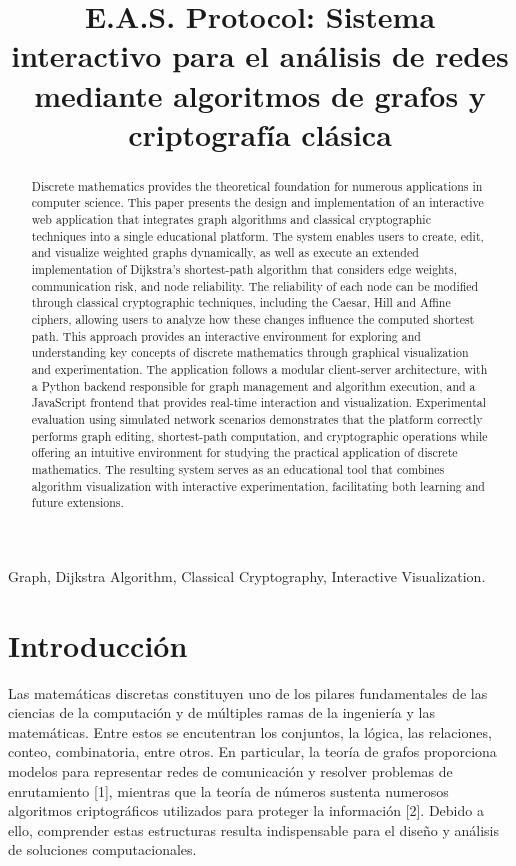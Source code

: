 \documentclass[conference]{IEEEtran}
\title{
E.A.S. Protocol: Sistema interactivo para el análisis de redes
mediante algoritmos de grafos y criptografía clásica
}
\author{
    \IEEEauthorblockN{
    Aimer Esteban Garcia Rojas,
    Jair Gomez Narvaez,
    Diego Alejandro Robayo Cordoba
    }

    \IEEEauthorblockA{
    Programa de Ingeniería de Sistemas\\
    Universidad Nacional de Colombia\\
    Julio 2026
    }
}
\begin{document}
\maketitle
\thispagestyle{empty}
\pagestyle{plain}
\setcounter{page}{1}

\begin{abstract}
    Discrete mathematics provides the theoretical foundation for numerous applications in computer science. This paper presents the design and implementation of an interactive web application that integrates graph algorithms and classical cryptographic techniques into a single educational platform. The system enables users to create, edit, and visualize weighted graphs dynamically, as well as execute an extended implementation of Dijkstra's shortest-path algorithm that considers edge weights, communication risk, and node reliability. The reliability of each node can be modified through classical cryptographic techniques, including the Caesar, Hill and Affine ciphers, allowing users to analyze how these changes influence the computed shortest path. This approach provides an interactive environment for exploring and understanding key concepts of discrete mathematics through graphical visualization and experimentation. The application follows a modular client-server architecture, with a Python backend responsible for graph management and algorithm execution, and a JavaScript frontend that provides real-time interaction and visualization. Experimental evaluation using simulated network scenarios demonstrates that the platform correctly performs graph editing, shortest-path computation, and cryptographic operations while offering an intuitive environment for studying the practical application of discrete mathematics. The resulting system serves as an educational tool that combines algorithm visualization with interactive experimentation, facilitating both learning and future extensions.
\end{abstract}


\begin{IEEEkeywords}
    Graph, Dijkstra Algorithm, Classical Cryptography, Interactive Visualization.
\end{IEEEkeywords}

\section{Introducción}
Las matemáticas discretas constituyen uno de los pilares fundamentales de las ciencias de la computación y de múltiples ramas de la ingeniería y las matemáticas. Entre estos se encutentran los conjuntos, la lógica, las relaciones, conteo, combinatoria, entre otros\cite{apuntes}. En particular, la teoría de grafos proporciona modelos para representar redes de comunicación y resolver problemas de enrutamiento [1], mientras que la teoría de números sustenta numerosos algoritmos criptográficos utilizados para proteger la información [2]. Debido a ello, comprender estas estructuras resulta indispensable para el diseño y análisis de soluciones computacionales.
\end{document}
